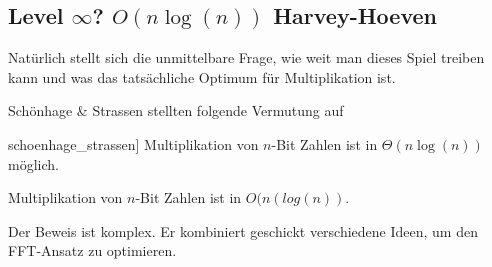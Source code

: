 
\subsection{Level \texorpdfstring{$\infty$}{infinity}? \texorpdfstring{$O(n\log(n))$}{O(n log(n))} Harvey-Hoeven}

\begin{remark}
    Natürlich stellt sich die unmittelbare Frage, wie weit man dieses Spiel treiben kann und was das tatsächliche Optimum für Multiplikation ist.

    Schönhage \& Strassen stellten folgende Vermutung auf
\end{remark}

\begin{conjecture}[Schönhage-Strassen \citep[283]{schoenhage_strassen}]
    Multiplikation von $n$-Bit Zahlen ist in $\Theta(n\log(n))$ möglich.
\end{conjecture}

\begin{theorem}
    Multiplikation von $n$-Bit Zahlen ist in $O(n(log(n))$.
\end{theorem}

\begin{remark}
    Der Beweis ist komplex. Er kombiniert geschickt verschiedene Ideen, um den FFT-Ansatz zu optimieren.
\end{remark}

